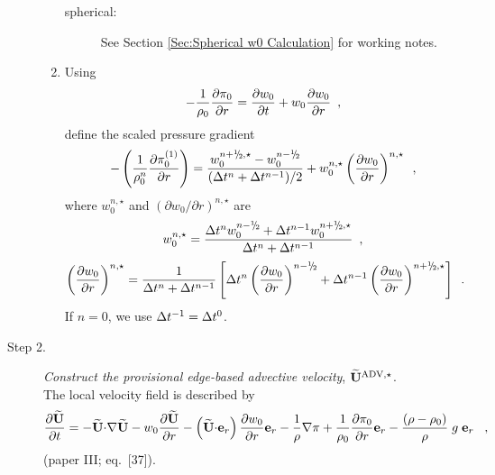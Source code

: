 \begin{description}
\begin{enumerate}
\begin{description}
\item[spherical:] See Section \ref{Sec:Spherical w0 Calculation} for working notes.

\end{description}

\item Using 
\begin{equation}
- \frac{1}{\rho_0} \frac{\partial \pi_0}{\partial r} 
= \frac{\partial w_0}{\partial t} + w_0 \frac{\partial w_0}{\partial r} 
\enskip, \label{eq:pizero}
\end{equation}
define the scaled pressure gradient
\begin{equation}
-\left ( \frac{1}{\rho_0^n} \frac{\partial \pizeroone}{\partial r} \right ) = 
\frac{w_0^{\nph,\star} - w_0^\nmh}{(\dt^n+\dt^{n-1})/2} 
+  w_0^{n,\star} \left(\frac{\partial w_0}{\partial r}\right)^{n,\star} \enskip ,
\end{equation} 
where $w_0^{n,\star}$ and $(\partial w_0 / \partial r)^{n,\star}$ are
\begin{equation}
w_0^{n,\star} = \frac{\dt^{n} w_0^{\nmh} + \dt^{n-1} w_0^{\nph,\star}}{\dt^n+\dt^{n-1}} 
\enskip,\end{equation}
\begin{equation}
\left(\frac{\partial w_0}{\partial r}\right)^{n,\star} = 
\frac{1}{\dt^n+\dt^{n-1} } 
\left [ \dt^{n} \left(\frac{\partial w_0 }{ \partial r}\right)^{\nmh}
+ \dt^{n-1} \left(\frac{\partial w_0 }{ \partial r}\right)^{\nph,\star} \right ] 
\enskip.\end{equation}
If $n=0$, we use $\Delta t^{-1} = \Delta t^0$.

\end{enumerate}

\item[Step 2.] {\em Construct the provisional edge-based advective velocity}, $\widetilde{\mathbf{U}}^{\mathrm{ADV},\star}$.\\

The local velocity field is described by
\begin{equation}
\frac{\partial\widetilde{{\bf U}}}{\partial t} = - \widetilde{{\bf U}} \mathbf{\cdot} \mathbf{\nabla} \widetilde{{\bf U}} - w_0 \frac{\partial \widetilde{{\bf U}}}{\partial r}
                                 - \left(\widetilde{{\bf U}} \mathbf{\cdot} \mathbf{e}_r\right) \frac{\partial w_0}{\partial r} \mathbf{e}_r
                                 - \frac{1}{\rho} \mathbf{\nabla}\pi
                                 + \frac{1}{\rho_0} \frac{\partial \pi_0}{\partial r} \mathbf{e}_r
                                 - \frac{(\rho-\rho_0)}{\rho} \; g \; \mathbf{e}_r  \label{eq:utildeupd}  \enskip\
 ,
\end{equation}
(paper III; eq.~[37]).


\end{description}

